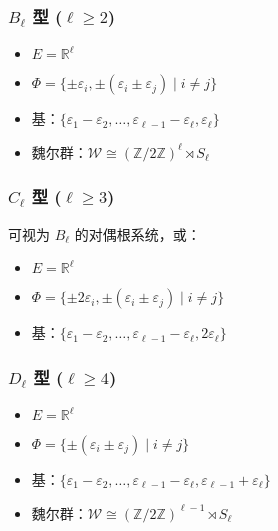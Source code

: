 \subsubsection{\texorpdfstring{$B_\ell$}{B_ell} 型 (\texorpdfstring{$\ell \geq 2$}{ell geq 2})}

\begin{itemize}
	\item $E = \mathbb{R}^\ell$
	\item $\Phi = \{\pm\varepsilon_i, \pm(\varepsilon_i \pm \varepsilon_j) \mid i \neq j\}$
	\item 基：$\{\varepsilon_1 - \varepsilon_2, \ldots, \varepsilon_{\ell-1} - \varepsilon_\ell, \varepsilon_\ell\}$
	\item 魏尔群：$\mathcal{W} \cong (\mathbb{Z}/2\mathbb{Z})^\ell \rtimes S_\ell$
\end{itemize}

\subsubsection{\texorpdfstring{$C_\ell$}{C_ell} 型 (\texorpdfstring{$\ell \geq 3$}{ell geq 3})}

可视为 $B_\ell$ 的对偶根系统，或：

\begin{itemize}
	\item $E = \mathbb{R}^\ell$
	\item $\Phi = \{\pm 2\varepsilon_i, \pm(\varepsilon_i \pm \varepsilon_j) \mid i \neq j\}$
	\item 基：$\{\varepsilon_1 - \varepsilon_2, \ldots, \varepsilon_{\ell-1} - \varepsilon_\ell, 2\varepsilon_\ell\}$
\end{itemize}

\subsubsection{\texorpdfstring{$D_\ell$}{D_ell} 型 (\texorpdfstring{$\ell \geq 4$}{ell geq 4})}

\begin{itemize}
	\item $E = \mathbb{R}^\ell$
	\item $\Phi = \{\pm(\varepsilon_i \pm \varepsilon_j) \mid i \neq j\}$
	\item 基：$\{\varepsilon_1 - \varepsilon_2, \ldots, \varepsilon_{\ell-1} - \varepsilon_\ell, \varepsilon_{\ell-1} + \varepsilon_\ell\}$
	\item 魏尔群：$\mathcal{W} \cong (\mathbb{Z}/2\mathbb{Z})^{\ell-1} \rtimes S_\ell$
\end{itemize}

